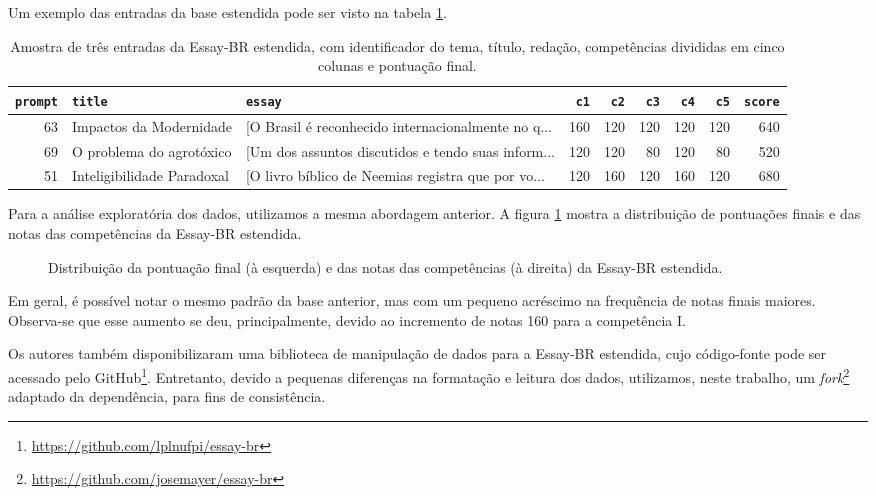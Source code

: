Um exemplo das entradas da base estendida pode ser visto na tabela \ref{tab:essay-br-extended}.

\begin{table}[H]
    \centering
    \caption{Amostra de três entradas da Essay-BR estendida, com identificador do tema, título, redação, competências divididas em cinco colunas e pontuação final.}
    \label{tab:essay-br-extended}
    \begin{tabularx}{\textwidth}{rXXrrrrrr}
        \toprule
        \texttt{prompt} & \texttt{title} & \texttt{essay} & \texttt{c1} & \texttt{c2} & \texttt{c3} & \texttt{c4} & \texttt{c5} & \texttt{score} \\
        \midrule
             63 & Impactos da Modernidade & [O Brasil é reconhecido internacionalmente no q... & 160 & 120 & 120 & 120 & 120 & 640 \\
             69 & O problema do agrotóxico & [Um dos assuntos discutidos e tendo suas inform... & 120 & 120 &  80 & 120 &  80 & 520 \\
             51 & Inteligibilidade Paradoxal & [O livro bíblico de Neemias registra que por vo... & 120 & 160 & 120 & 160 & 120 & 680 \\
        \bottomrule
    \end{tabularx}
\end{table}

Para a análise exploratória dos dados, utilizamos a mesma abordagem anterior. A figura \ref{fig:essay-br-extended-analysis} mostra a distribuição de pontuações finais e das notas das competências da Essay-BR estendida.

\begin{figure}[H]
    \caption{Distribuição da pontuação final (à esquerda) e das notas das competências (à direita) da Essay-BR estendida.}
    \label{fig:essay-br-extended-analysis}
    \centering
    \resizebox{\textwidth}{!}{}
\end{figure}

Em geral, é possível notar o mesmo padrão da base anterior, mas com um pequeno acréscimo na frequência de notas finais maiores. Observa-se que esse aumento se deu, principalmente, devido ao incremento de notas 160 para a competência I.

Os autores \citet{marinho-et-al-22} também disponibilizaram uma biblioteca de manipulação de dados para a Essay-BR estendida, cujo código-fonte pode ser acessado pelo GitHub\footnote{\url{https://github.com/lplnufpi/essay-br}}. Entretanto, devido a pequenas diferenças na formatação e leitura dos dados, utilizamos, neste trabalho, um \textit{fork}\footnote{\url{https://github.com/josemayer/essay-br}} adaptado da dependência, para fins de consistência.

